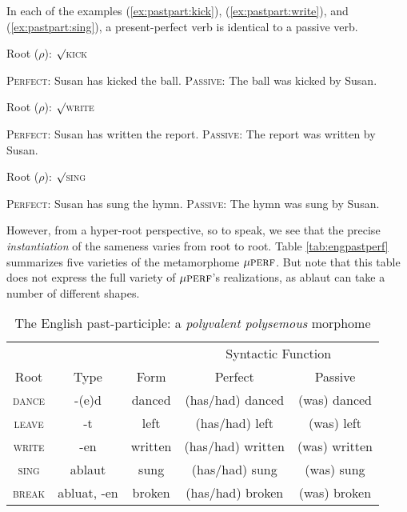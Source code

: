 In each of the examples (\ref{ex:pastpart:kick}), (\ref{ex:pastpart:write}), and (\ref{ex:pastpart:sing}), a present-perfect verb is identical to 
a passive verb.
\begin{exe}
\label{ex:pastpart}
	\ex Root ($\rho$): $\surd$\textsc{kick}
		\begin{xlist} \label{ex:pastpart:kick}
		\ex \textsc{Perfect:} Susan has kicked the ball. \label{ex:pastpart:kick:perf}
		\ex \textsc{Passive:} The ball was kicked by Susan.\label{ex:pastpart:kick:pass}
		\end{xlist}
	\ex Root ($\rho$): $\surd$\textsc{write}
		\begin{xlist} \label{ex:pastpart:write}
		\ex \textsc{Perfect:} Susan has written the report. \label{ex:pastpart:write:perf}
		\ex \textsc{Passive:} The report was written by Susan. \label{ex:pastpart:write:pass}
		\end{xlist}
	\ex Root ($\rho$): $\surd$\textsc{sing}
		\begin{xlist} \label{ex:pastpart:sing}
		\ex \textsc{Perfect:} Susan has sung the hymn. \label{ex:pastpart:sing:perf}
		\ex \textsc{Passive:} The hymn was sung by Susan. \label{ex:pastpart:sing:pass}
		\end{xlist}
\end{exe}
However,
from a hyper-root perspective, so to speak, we see that the precise \emph{instantiation} of the sameness varies from root to root.  
Table \ref{tab:engpastperf} summarizes five varieties of the metamorphome $\mu{\textsc{perf}}$. But note that this table
does not express the full variety of $\mu{\textsc{perf}}$'s realizations, as ablaut can take a number of different shapes.
\begin{table}[ht]
\centering %
\begin{tabular}{c c c c c} %
\hline
& & & \multicolumn{2}{c}{Syntactic Function} \\[-1ex] 
Root & Type & Form & Perfect & Passive  \\ [0.5ex] %
\hline
\textsc{dance} & -(e)d & danced & (has/had) danced & (was) danced \\
\textsc{leave} & -t & left & (has/had) left & (was) left \\ 
\textsc{write} & -en & written & (has/had) written & (was) written \\
\textsc{sing} & ablaut & sung & (has/had) sung & (was) sung \\
\textsc{break} & abluat, -en & broken & (has/had) broken & (was) broken \\
\hline 
\end{tabular}
\label{tab:engpastpart}
\caption{The English past-participle: a \emph{polyvalent polysemous} morphome}
\end{table}

